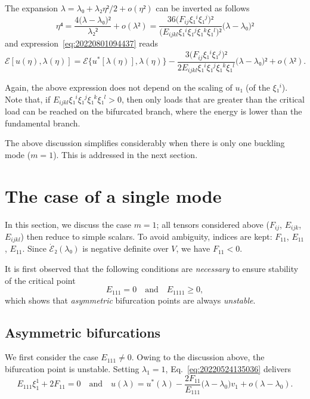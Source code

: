 \documentclass[12pt, final]{scrartcl}
\theoremstyle{definition}
\begin{document}
The expansion \(λ = λ₀ + λ₂ η² / 2 + o(η²)\) can be inverted as follows
\begin{equation}
  η⁴ = \frac{4 \bigl(λ - λ₀\bigr)²}{λ₂²} + o(λ²) = \frac{36 \bigl( F_{ij} ξ₁^i ξ₁^j \bigr)²}{\bigl( E_{ijkl} ξ₁^i ξ₁^j ξ₁^k ξ₁^l \bigr)²} \bigl( λ - λ₀ \bigr)²
\end{equation}
and expression~\eqref{eq:20220801094437} reads
\begin{equation}
  ℰ[u(η), λ(η)] = ℰ\{u^{\ast}[λ(η)], λ(η)\} - \frac{3 \bigl( F_{ij} ξ₁^i ξ₁^j \bigr)²}{2 E_{ijkl} ξ₁^i ξ₁^j ξ₁^k ξ₁^l } \bigl( λ - λ₀ \bigr)²  + o(λ²).
\end{equation}

Again, the above expression does not depend on the scaling of \(u₁\) (of the
\(ξ₁^i\)). Note that, if \(E_{ijkl} ξ₁^i ξ₁^j ξ₁^k ξ₁^l > 0\), then only loads
that are greater than the critical load can be reached on the bifurcated branch,
where the energy is lower than the fundamental branch.

\medskip

The above discussion simplifies considerably when there is only one buckling
mode (\(m = 1\)). This is addressed in the next section.

\section{The case of a single mode}

In this section, we discuss the case \(m = 1\); all tensors considered above
(\(F_{ij}\), \(E_{ijk}\), \(E_{ijkl}\)) then reduce to simple scalars. To avoid
ambiguity, indices are kept: \(F_{11}\), \(E_{11}\), \(E_{11}\). Since
\(\dot{ℰ}₂(λ₀)\) is negative definite over \(V\), we have \(F_{11} < 0\).

It is first observed that the following conditions are \emph{necessary} to
ensure stability of the critical point
\begin{equation}
  E_{111} = 0 \quad \text{and} \quad E_{1111} ≥ 0,
\end{equation}
which shows that \emph{asymmetric} bifurcation points are always
\emph{unstable}.

\subsection{Asymmetric bifurcations}

We first consider the case \(E_{111} ≠ 0\). Owing to the discussion above, the
bifurcation point is unstable. Setting \(λ_1=1\), Eq.~\eqref{eq:20220524135036} delivers
\begin{equation}
  E_{111} ξ_1^1 + 2F_{11} = 0 \quad \text{and} \quad u(λ) = u^\ast(λ) - \frac{2F_{11}}{E_{111}} \bigl( λ - λ_0 \bigr) v_1 + o(λ - λ_0).
\end{equation}
\end{document}
